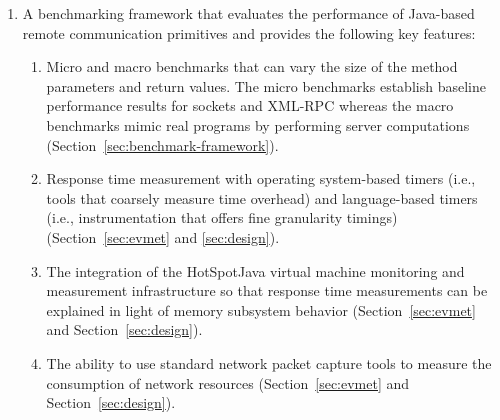 \documentclass{sig-alternate}
\begin{document}


\begin{enumerate}

\setlength{\itemsep}{0in}
 \setlength{\topsep}{0in}
 \setlength{\partopsep}{0in}

\item A benchmarking framework that evaluates the performance of
  Java-based remote communication primitives and provides the
  following key features:

\begin{enumerate}

\setlength{\itemsep}{0in}
 \setlength{\topsep}{0in}
 \setlength{\partopsep}{0in}

\item Micro and macro benchmarks that can vary the size of the method
  parameters and return values.  The micro benchmarks establish
  baseline performance results for sockets and XML-RPC whereas the
  macro benchmarks mimic real programs by performing server
  computations (Section~\ref{sec:benchmark-framework}).

\item \begin{sloppypar} Response time measurement with operating
  system-based timers (i.e., tools that coarsely measure time
  overhead) and language-based timers (i.e., instrumentation that
  offers fine granularity timings) (Section~\ref{sec:evmet} and
  \ref{sec:design}). \end{sloppypar}

\item The integration of the HotSpot\texttrademark Java virtual
  machine monitoring and measurement infrastructure so that response
  time measurements can be explained in light of memory subsystem
  behavior (Section~\ref{sec:evmet} and Section~\ref{sec:design}).

\item The ability to use standard network packet capture tools to
  measure the consumption of network resources
  (Section~\ref{sec:evmet} and Section~\ref{sec:design}).


\end{enumerate}
\end{enumerate}
\end{document}
